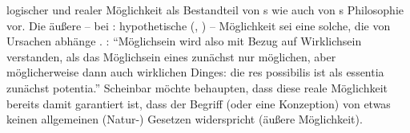 \begin{nummerierung}
{logischer und realer Möglichkeit als Bestandteil von
s wie auch von
s Philosophie vor. Die
äußere -- bei :
hypothetische
\mkbibparens{\cite[Vgl.][\S~16]{Baumgarten:Metaphysica---Metaphysik2011},
\cite[][XVII: 30.8--12]{Kant:GesammelteWerke1900ff.}} -- Möglichkeit sei eine
solche, die von Ursachen abhänge
\parencite[vgl.][86]{Seidl:ArtikelenquoteMoeglichkeit1984}.
\cite[Siehe auch][17]{Schneiders:Deusestphilosophusabsolutesummus1986}:
\enquote{Möglichsein wird also mit Bezug auf Wirklichsein verstanden, als das
Möglichsein eines zunächst nur möglichen, aber möglicherweise dann auch
wirklichen Dinges: die res possibilis ist als essentia zunächst potentia.}}
Scheinbar möchte
 behaupten,
dass diese reale Möglichkeit bereits damit garantiert ist, dass der Begriff
(oder eine Konzeption) von etwas keinen allgemeinen (Natur-) Gesetzen
widerspricht (äußere Möglichkeit).


\end{nummerierung}
